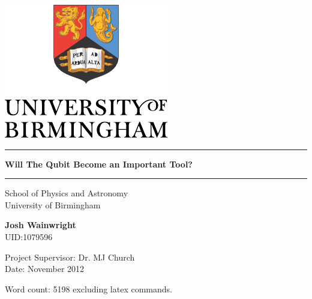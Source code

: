 \begin{titlepage}
  \begin{center}
    \vspace*{\fill}

    \centering
    \includegraphics[scale=1.0]{Logo.pdf}
    \vfill

    \hrule
    {\LARGE\bf Will The Qubit Become an Important Tool?\\[0.4cm]}
    \hrule

    \vfill
    \large
    School of Physics and Astronomy\\
    University of Birmingham

    \vfill
    {\bf Josh Wainwright\\}
    UID:1079596
    \vfill

    \vfill
    Project Supervisor: Dr. MJ Church\\
    Date: November 2012
    \vfill
    
    \vfill
    {\small Word count: 5198 excluding latex commands.}

  \end{center}
\end{titlepage}


